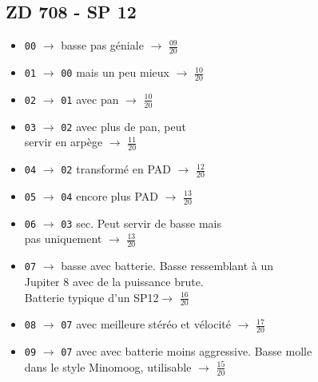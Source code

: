 \documentclass[a4paper, 13pt]{article}
\begin{document}
\vspace{1cm}
\subsection*{ZD 708 - SP 12}
\begin{itemize}
    \item \texttt{00} $\rightarrow$ basse pas géniale $\rightarrow$ \Large{$\frac{09}{20}$} \normalsize \vspace{0.2cm}
    \item \texttt{01} $\rightarrow$ \texttt{00} mais un peu mieux $\rightarrow$ \Large{$\frac{10}{20}$} \normalsize \vspace{0.2cm}
    \item \texttt{02} $\rightarrow$ \texttt{01} avec pan $\rightarrow$ \Large{$\frac{10}{20}$} \normalsize \vspace{0.2cm}
    \item \texttt{03} $\rightarrow$ \texttt{02} avec plus de pan, peut \\ servir en arpège $\rightarrow$ \Large{$\frac{11}{20}$} \normalsize \vspace{0.2cm}
    \item \texttt{04} $\rightarrow$ \texttt{02} transformé en PAD $\rightarrow$ \Large{$\frac{12}{20}$} \normalsize \vspace{0.2cm}
    \item \texttt{05} $\rightarrow$ \texttt{04} encore plus PAD $\rightarrow$ \Large{$\frac{13}{20}$} \normalsize \vspace{0.2cm}
    \item \texttt{06} $\rightarrow$ \texttt{03} sec. Peut servir de basse mais \\ pas uniquement $\rightarrow$ \Large{$\frac{13}{20}$} \normalsize \vspace{0.2cm}
    \item \texttt{07} $\rightarrow$ basse avec batterie. Basse ressemblant à un \\ Jupiter 8 avec de la puissance brute. \\ Batterie typique d'un SP12$\rightarrow$ \Large{$\frac{16}{20}$} \normalsize \vspace{0.2cm}
    \item \texttt{08} $\rightarrow$ \texttt{07} avec meilleure stéréo et vélocité $\rightarrow$ \Large{$\frac{17}{20}$} \normalsize \vspace{0.2cm}
    \item \texttt{09} $\rightarrow$ \texttt{07} avec avec batterie moins aggressive. Basse molle \\ dans le style Minomoog, utilisable $\rightarrow$ \Large{$\frac{15}{20}$} \normalsize \vspace{0.2cm}

\end{itemize}
\end{document}
